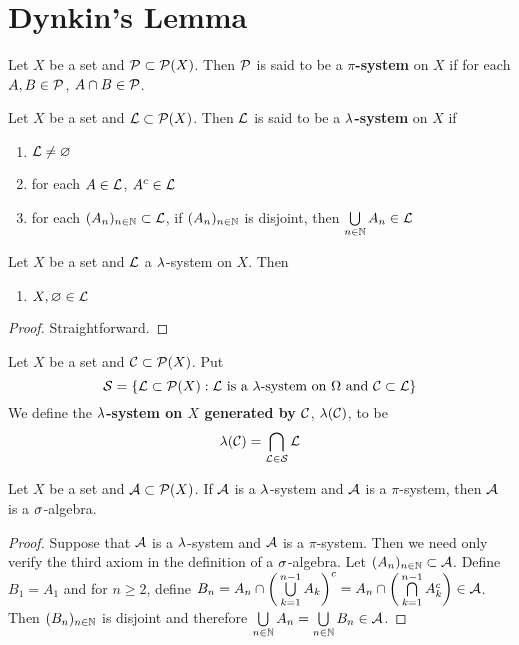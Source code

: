\documentclass{book}
\begin{document}
	
	\newpage
	\section{Dynkin's Lemma}
	\begin{defn}
		Let $X$ be a set and $\mathcal{P} \subset \mathcal{P}(X)$. Then $\mathcal{P}$ is said to be a \textbf{$\pi$-system} on $X$ if for each $A,B \in \mathcal{P}$, $A \cap B \in \mathcal{P}$.
	\end{defn}
	
	\begin{defn}
		Let $X$ be a set and $\mathcal{L} \subset \mathcal{P}(X)$. Then $\mathcal{L}$ is said to be a \textbf{$\lambda$-system} on $X$ if 
		\begin{enumerate}
			\item $\mathcal{L} \neq \varnothing$
			\item for each $A \in \mathcal{L}$, $A^c \in \mathcal{L}$
			\item for each $(A_n)_{n \in \mathbb{N}} \subset \mathcal{L}$, if $(A_n)_{n \in \mathbb{N}}$ is disjoint, then $\bigcup\limits_{n \in \mathbb{N}}A_n \in \mathcal{L}$
		\end{enumerate}
	\end{defn}
	
	\begin{ex}
		Let $X$ be a set and $\mathcal{L}$ a $\lambda$-system on $X$. Then 
		\begin{enumerate}
			\item $X, \varnothing \in \mathcal{L}$
		\end{enumerate} 
	\end{ex}
	
	\begin{proof}
		Straightforward.
	\end{proof}
	
	\begin{defn}
		Let $X$ be a set and $\mathcal{C} \subset \mathcal{P}(X)$. Put $$\mathcal{S} = \{\mathcal{L} \subset \mathcal{P}(X): \mathcal{L} \text{ is a }\lambda\text{-system on }\Omega \text{ and } \mathcal{C} \subset \mathcal{L}\}$$ We define the \textbf{$\lambda$-system on $X$ generated by $\mathcal{C}$}, $\lambda(\mathcal{C})$, to be $$\lambda(\mathcal{C}) = \bigcap_{\mathcal{L} \in \mathcal{S}}\mathcal{L}$$
	\end{defn}
	
	\begin{ex}
		Let $X$ be a set and $\mathcal{A} \subset \mathcal{P}(X)$. If $\mathcal{A}$ is a $\lambda$-system and $\mathcal{A}$ is a $\pi$-system, then $\mathcal{A}$ is a $\sigma$-algebra.
	\end{ex}
	
	\begin{proof}
		Suppose that $\mathcal{A}$ is a $\lambda$-system and $\mathcal{A}$ is a $\pi$-system. Then we need only verify the third axiom in the definition of a $\sigma$-algebra. Let $(A_n)_{n \in \mathbb{N}} \subset \mathcal{A}$. Define $B_1 = A_1$ and for $n \geq 2$, define $B_n = A_n \cap \bigg( \bigcup\limits_{k=1}^{n-1}A_k \bigg)^c = A_n \cap \bigg( \bigcap\limits_{k=1}^{n-1}A_k^c \bigg) \in \mathcal{A}$. Then $(B_n)_{n \in \mathbb{N}}$ is disjoint and therefore $\bigcup\limits_{n \in \mathbb{N}}A_n = \bigcup\limits_{n \in \mathbb{N}}B_n \in \mathcal{A}$.
	\end{proof}
	
\end{document}
